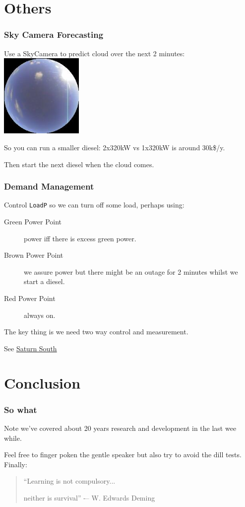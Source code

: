 \documentclass{beamer}
\begin{document}
\section{Others}
\begin{frame}\frametitle{Sky Camera Forecasting}
Use a SkyCamera to predict cloud over the next 2 minutes:
\pause
\includegraphics[width=4cm]{batch-2014-07-28T165557+0930-basis.jpg}
\pause

So you can run a smaller diesel: 2x320kW vs 1x320kW is around 30k\$/y.
\pause

Then start the next diesel when the cloud comes.
\end{frame}

\begin{frame}\frametitle{Demand Management}
Control \texttt{LoadP} so we can turn off some load, perhaps using:

\begin{description}
\item[Green Power Point] power iff there is excess green power.
\item[Brown Power Point] we assure power but there might be an outage
  for 2 minutes whilst we start a diesel.
\item[Red Power Point] always on.
\end{description}

The key thing is we need two way control and measurement.

See \href{http://www.saturnsouth.com}{Saturn South}
\end{frame}

\section{Conclusion}
\begin{frame}\frametitle{So what}
Note we've covered about 20 years research and development in
the last wee while.\pause

Feel free to finger poken the gentle speaker but also try to avoid the
dill tests.  \vfill \pause Finally:
\begin{quote}
“Learning is not compulsory...

\pause
neither is survival” -– W. Edwards Deming
\end{quote}
\end{frame}
\end{document}
